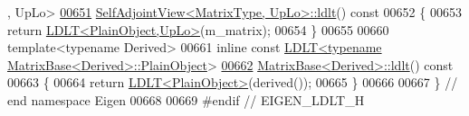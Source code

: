 \begin{DoxyCode}
      , UpLo>
\hyperlink{group___core___module_a644155eef17b37c95d85b9f65bb49ac4}{00651} \hyperlink{group___core___module_a644155eef17b37c95d85b9f65bb49ac4}{SelfAdjointView<MatrixType, UpLo>::ldlt}()\textcolor{keyword}{ const}
00652 \textcolor{keyword}{}\{
00653   \textcolor{keywordflow}{return} \hyperlink{group___cholesky___module_class_eigen_1_1_l_d_l_t}{LDLT<PlainObject,UpLo>}(m\_matrix);
00654 \}
00655 
00660 \textcolor{keyword}{template}<\textcolor{keyword}{typename} Derived>
00661 \textcolor{keyword}{inline} \textcolor{keyword}{const} \hyperlink{group___cholesky___module_class_eigen_1_1_l_d_l_t}{LDLT<typename MatrixBase<Derived>::PlainObject}>
\hyperlink{group___core___module_a0ecf058a0727a4cab8b42d79e95072e1}{00662} \hyperlink{group___core___module_a0ecf058a0727a4cab8b42d79e95072e1}{MatrixBase<Derived>::ldlt}()\textcolor{keyword}{ const}
00663 \textcolor{keyword}{}\{
00664   \textcolor{keywordflow}{return} \hyperlink{group___cholesky___module_class_eigen_1_1_l_d_l_t}{LDLT<PlainObject>}(derived());
00665 \}
00666 
00667 \} \textcolor{comment}{// end namespace Eigen}
00668 
00669 \textcolor{preprocessor}{#endif // EIGEN\_LDLT\_H}
\end{DoxyCode}
